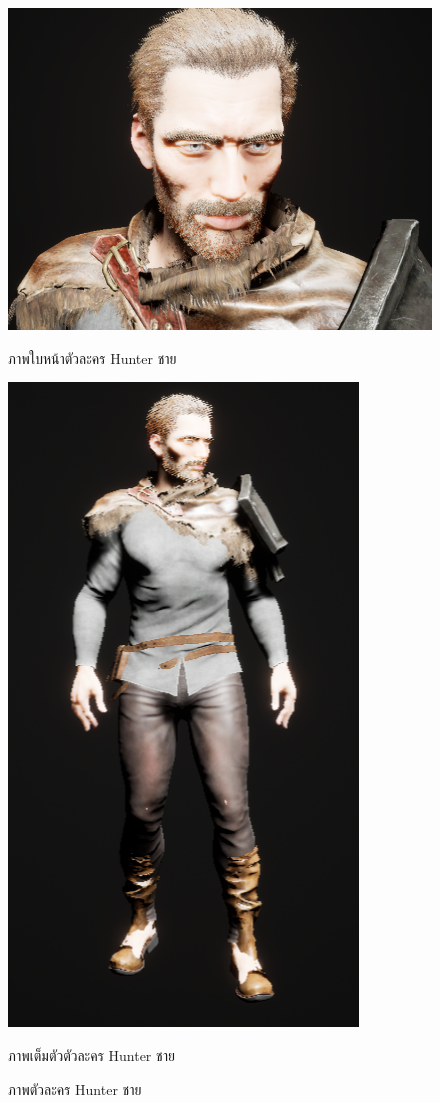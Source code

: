 \begin{figure}
  \centering
  \begin{subcaptionblock}{.4\textwidth}
    \centering
    \includegraphics[width=.8\linewidth]{./img/characters/eric_face.png}
    \caption{ภาพใบหน้าตัวละคร Hunter ชาย}\label{ภาพใบหน้าตัวละคร Hunter ชาย}
  \end{subcaptionblock}%
  \begin{subcaptionblock}{.4\textwidth}
    \centering
    \includegraphics[width=.8\linewidth]{./img/characters/eric_full.png}
    \caption{ภาพเต็มตัวตัวละคร Hunter ชาย}\label{ภาพตัวเต็มตัวละคร Hunter ชาย}
  \end{subcaptionblock}%
  \caption{ภาพตัวละคร Hunter ชาย}\label{fig:eric}
\end{figure}

